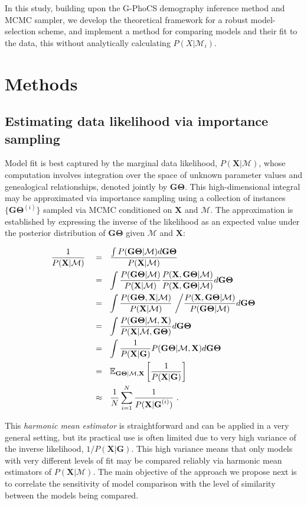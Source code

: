 \documentclass[11pt]{article}
\newcommand{\vect}[1]{\boldsymbol{\mathbf{#1}}}
\newcommand{\E}{\mathbb{E}}
\newcommand{\X}{\vect{X}}
\newcommand{\M}{\mathcal{M}}
\newcommand{\G}{\vect{G}}
\newcommand{\T}{\vect{\Theta}}
\newcommand{\GT}{\G\T}
\newcommand{\1}{\mathbbm{1}}
\newcommand{\gp}{G-PhoCS }
\begin{document}
%
In this study, building upon the \gp demography inference method and MCMC sampler, we develop the theoretical framework for a robust model-selection scheme, and implement a method for comparing models and their fit to the data, this without analytically calculating $P(X|\M_i)$.

\section{Methods} \label{Methods}


\subsection{Estimating data likelihood via importance sampling}

Model fit is best captured by the marginal data likelihood, $P(\X|\M)$, whose computation involves integration over the space of unknown parameter values and genealogical relationships,
denoted jointly by $\GT$.
%
This high-dimensional integral may be approximated via importance sampling using a collection of instances $\{\GT^{(i)}\}$ sampled via MCMC conditioned on $\X$ and $\M$.
%
The approximation is established by expressing the inverse of the likelihood as an expected value under the posterior distribution of $\GT$ given $\M$ and $\X$:
%
%
\begin{small}
\begin{align}
\frac{1}{P(\X|\M)} ~~~
&=~~ \frac{\int P(\GT|\M)d\GT}{P(\X|\M)} \notag \\ %
&=~~ \int \frac{P(\GT|\M)}{P(\X|\M)} \frac{P(\X,\GT|\M)}{P(\X,\GT|\M)}  d\GT \notag \\ %
&=~~ \int \frac{P(\GT,\X |\M)}{P(\X|\M)} ~\bigg/ \frac{P(\X,\GT|\M)}{P(\GT|\M)}  d\GT \notag \\ %
&=~~ \int \frac{P(\GT|\M,\X)}{P(\X|\M,\GT)} d\GT \notag \\ %
&=~~ \int \frac{1}{P(\X|\G)}P(\GT|\M,\X) d\GT  \notag \\ %
&=~~ \E_{\GT|\M,\X } \left[\frac{1}{P(\X|\G)}\right] \notag\\  %
&\approx~~ \frac{1}{N} \sum_{i=1}^{N}\frac{1}{P(\X|\G^{(i)})} ~. \label{eq:harmonic}
\end{align}
\end{small}

This {\em harmonic mean estimator} is straightforward and can be applied in a very general setting, but its practical use is often limited due to very high variance
of the inverse likelihood, $1/P(\X|\G)$.
%
This high variance means that only models with very different levels of fit may be compared reliably via harmonic mean estimators of $P(\X|\M)$.
%
The main objective of the approach we propose next is to correlate the sensitivity of model comparison with the level of similarity between the models being compared.
%
\end{document}
